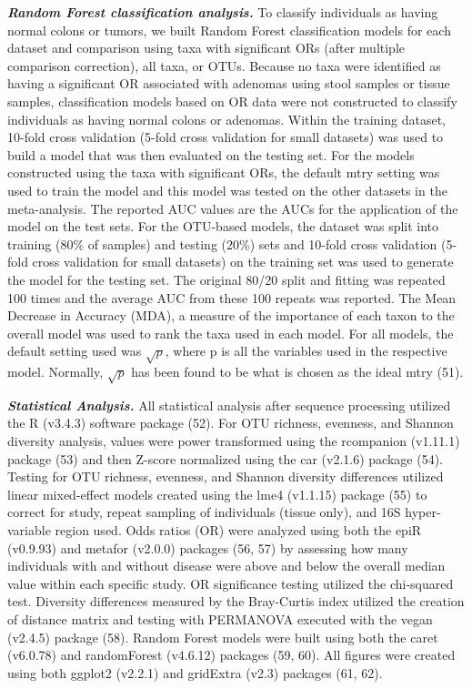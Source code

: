 \documentclass[12pt,]{article}
\begin{document}
\textbf{\emph{Random Forest classification analysis.}} To classify
individuals as having normal colons or tumors, we built Random Forest
classification models for each dataset and comparison using taxa with
significant ORs (after multiple comparison correction), all taxa, or
OTUs. Because no taxa were identified as having a significant OR
associated with adenomas using stool samples or tissue samples,
classification models based on OR data were not constructed to classify
individuals as having normal colons or adenomas. Within the training
dataset, 10-fold cross validation (5-fold cross validation for small
datasets) was used to build a model that was then evaluated on the
testing set. For the models constructed using the taxa with significant
ORs, the default mtry setting was used to train the model and this model
was tested on the other datasets in the meta-analysis. The reported AUC
values are the AUCs for the application of the model on the test sets.
For the OTU-based models, the dataset was split into training (80\% of
samples) and testing (20\%) sets and 10-fold cross validation (5-fold
cross validation for small datasets) on the training set was used to
generate the model for the testing set. The original 80/20 split and
fitting was repeated 100 times and the average AUC from these 100
repeats was reported. The Mean Decrease in Accuracy (MDA), a measure of
the importance of each taxon to the overall model was used to rank the
taxa used in each model. For all models, the default setting used was
\(\sqrt{p}\), where p is all the variables used in the respective model.
Normally, \(\sqrt{p}\) has been found to be what is chosen as the ideal
mtry (51).

\textbf{\emph{Statistical Analysis.}} All statistical analysis after
sequence processing utilized the R (v3.4.3) software package (52). For
OTU richness, evenness, and Shannon diversity analysis, values were
power transformed using the rcompanion (v1.11.1) package (53) and then
Z-score normalized using the car (v2.1.6) package (54). Testing for OTU
richness, evenness, and Shannon diversity differences utilized linear
mixed-effect models created using the lme4 (v1.1.15) package (55) to
correct for study, repeat sampling of individuals (tissue only), and 16S
hyper-variable region used. Odds ratios (OR) were analyzed using both
the epiR (v0.9.93) and metafor (v2.0.0) packages (56, 57) by assessing
how many individuals with and without disease were above and below the
overall median value within each specific study. OR significance testing
utilized the chi-squared test. Diversity differences measured by the
Bray-Curtis index utilized the creation of distance matrix and testing
with PERMANOVA executed with the vegan (v2.4.5) package (58). Random
Forest models were built using both the caret (v6.0.78) and randomForest
(v4.6.12) packages (59, 60). All figures were created using both ggplot2
(v2.2.1) and gridExtra (v2.3) packages (61, 62).
\end{document}

